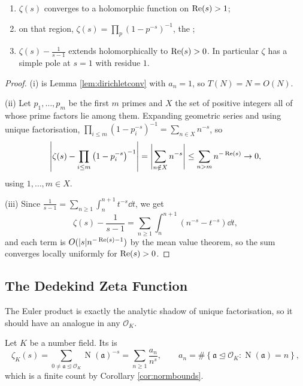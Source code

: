 \documentclass[a4paper]{scrartcl}
\renewcommand{\OO}{\mathcal{O}}
\newcommand{\Nm}{\operatorname{N}}
\newcommand{\fa}{\mathfrak{a}}
\begin{document}
\begin{proposition}\label{prop:zetaprops}
	\begin{enumerate}[label=(\roman*)]
		\item $\zeta(s)$ converges to a holomorphic function on $\operatorname{Re}(s)>1$;
		\item on that region, $\displaystyle\zeta(s) = \prod_{p}\left(1-p^{-s}\right)^{-1}$, the ;
		\item $\zeta(s) - \frac1{s-1}$ extends holomorphically to $\operatorname{Re}(s)>0$. In particular $\zeta$ has a simple pole at $s=1$ with residue $1$.
	\end{enumerate}
\end{proposition}

\begin{proof}
	(i) is Lemma \ref{lem:dirichletconv} with $a_n = 1$, so $T(N) = N = O(N)$.

	(ii) Let $p_1,\dots,p_m$ be the first $m$ primes and $X$ the set of positive integers all of whose prime factors lie among them. Expanding geometric series and using unique factorisation, $\prod_{i\le m}(1-p_i^{-s})^{-1} = \sum_{n\in X}n^{-s}$, so
	$$\left|\zeta(s) - \prod_{i\le m}\left(1-p_i^{-s}\right)^{-1}\right| = \left|\sum_{n\notin X}n^{-s}\right|\le\sum_{n > m}n^{-\operatorname{Re}(s)} \to 0,$$
	using $1,\dots,m \in X$.

	(iii) Since $\frac1{s-1} = \sum_{n\ge1}\int_n^{n+1}t^{-s}\dd t$, we get
	$$\zeta(s)-\frac1{s-1} = \sum_{n\ge1}\int_n^{n+1}\left(n^{-s}-t^{-s}\right)\dd t,$$
	and each term is $O(\lvert s\rvert n^{-\operatorname{Re}(s)-1})$ by the mean value theorem, so the sum converges locally uniformly for $\operatorname{Re}(s)>0$.
\end{proof}

\subsection{The Dedekind Zeta Function}

The Euler product is exactly the analytic shadow of unique factorisation, so it should have an analogue in any $\OO_K$.

\begin{definition}
	Let $K$ be a number field. Its  is
	$$\zeta_K(s) = \sum_{0 \neq \fa\trianglelefteq\OO_K}\Nm(\fa)^{-s} = \sum_{n\ge1}\frac{a_n}{n^s}, \qquad a_n = \#\left\{\fa\trianglelefteq\OO_K : \Nm(\fa) = n\right\},$$
	which is a finite count by Corollary \ref{cor:normbounds}.
\end{definition}
\end{document}
